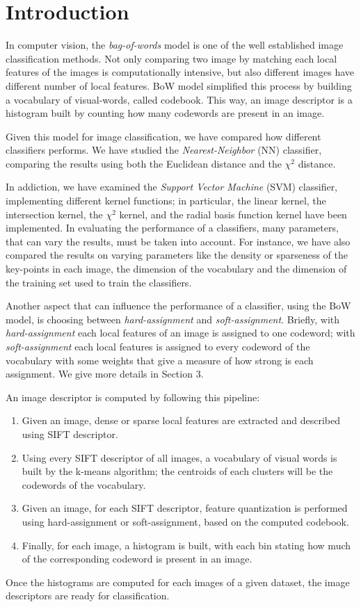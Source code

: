 \section{Introduction}

In computer vision, the \emph{bag-of-words} model is one of the well established image classification methods. Not only comparing two image by matching each local features of the images is computationally intensive, but also different images have different number of local features. BoW model simplified this process by building a vocabulary of visual-words, called codebook. This way, an image descriptor is a histogram built by counting how many codewords are present in an image.

Given this model for image classification, we have compared how different classifiers performs.
We have studied the \emph{Nearest-Neighbor} (NN) classifier, comparing the results using both the Euclidean distance and the $\chi^2$ distance.

In addiction, we have examined the \emph{Support Vector Machine} (SVM) classifier, implementing different kernel functions; in particular, the linear kernel, the intersection kernel, the $\chi^2$ kernel, and the radial basis function kernel have been implemented.
In evaluating the performance of a classifiers, many parameters, that can vary the results, must be taken into account.
For instance, we have also compared the results on varying parameters like the density or sparseness of the key-points in each image, the dimension of the vocabulary and the dimension of the training set used to train the classifiers.

Another aspect that can influence the performance of a classifier, using the BoW model, is choosing between \emph{hard-assignment} and \emph{soft-assignment}. Briefly, with \emph{hard-assignment} each local features of an image is assigned to one codeword; with \emph{soft-assignment} each local features is assigned to every codeword of the vocabulary with some weights that give a measure of how strong is each assignment. We give more details in Section 3.

An image descriptor is computed by following this pipeline:
\begin{enumerate}
\item Given an image, dense or sparse local features are extracted and described using SIFT descriptor.
\item Using every SIFT descriptor of all images, a vocabulary of visual words is built by the k-means algorithm; the centroids of each clusters will be the codewords of the vocabulary.
\item Given an image, for each SIFT descriptor, feature quantization is performed using hard-assignment or soft-assignment, based on the computed codebook.
\item Finally, for each image, a histogram is built, with each bin stating how much of the corresponding codeword is present in an image.
\end{enumerate}

Once the histograms are computed for each images of a given dataset, the image descriptors are ready for classification.
